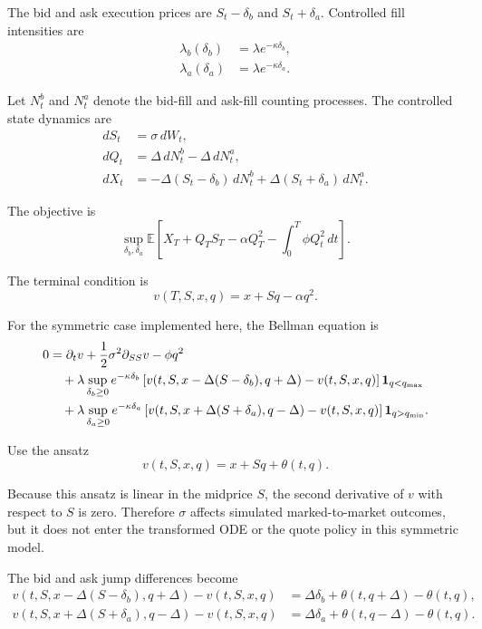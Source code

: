 \documentclass[11pt]{article}
\begin{document}
The bid and ask execution prices are $S_t-\delta_b$ and $S_t+\delta_a$. Controlled fill intensities are
\begin{align}
\lambda_b(\delta_b) &= \lambda e^{-\kappa\delta_b}, \\
\lambda_a(\delta_a) &= \lambda e^{-\kappa\delta_a}.
\end{align}

Let $N_t^b$ and $N_t^a$ denote the bid-fill and ask-fill counting processes. The controlled state dynamics are
\begin{align}
dS_t &= \sigma\,dW_t, \\
dQ_t &= \Delta\,dN_t^b-\Delta\,dN_t^a, \\
dX_t &= -\Delta(S_t-\delta_b)\,dN_t^b
      + \Delta(S_t+\delta_a)\,dN_t^a.
\end{align}

The objective is
\begin{equation}
\sup_{\delta_b,\delta_a}
\mathbb{E}\left[
X_T + Q_T S_T
- \alpha Q_T^2
- \int_0^T \phi Q_t^2\,dt
\right].
\end{equation}

The terminal condition is
\begin{equation}
v(T,S,x,q)=x+Sq-\alpha q^2.
\end{equation}

For the symmetric case implemented here, the Bellman equation is
\begin{align}
0
&= \partial_t v + \frac{1}{2}\sigma^2\partial_{SS}v - \phi q^2 \notag\\
&\quad + \lambda\sup_{\delta_b \ge 0}
e^{-\kappa\delta_b}
\left[
v(t,S,x-\Delta(S-\delta_b),q+\Delta)-v(t,S,x,q)
\right]\mathbf{1}_{q<q_{\max}} \notag\\
&\quad + \lambda\sup_{\delta_a \ge 0}
e^{-\kappa\delta_a}
\left[
v(t,S,x+\Delta(S+\delta_a),q-\Delta)-v(t,S,x,q)
\right]\mathbf{1}_{q>q_{\min}}.
\end{align}

Use the ansatz
\begin{equation}
v(t,S,x,q)=x+Sq+\theta(t,q).
\end{equation}

Because this ansatz is linear in the midprice $S$, the second derivative of $v$ with respect to $S$ is zero. Therefore $\sigma$ affects simulated marked-to-market outcomes, but it does not enter the transformed ODE or the quote policy in this symmetric model.

The bid and ask jump differences become
\begin{align}
v(t,S,x-\Delta(S-\delta_b),q+\Delta)-v(t,S,x,q)
&= \Delta\delta_b+\theta(t,q+\Delta)-\theta(t,q), \\
v(t,S,x+\Delta(S+\delta_a),q-\Delta)-v(t,S,x,q)
&= \Delta\delta_a+\theta(t,q-\Delta)-\theta(t,q).
\end{align}
\end{document}
